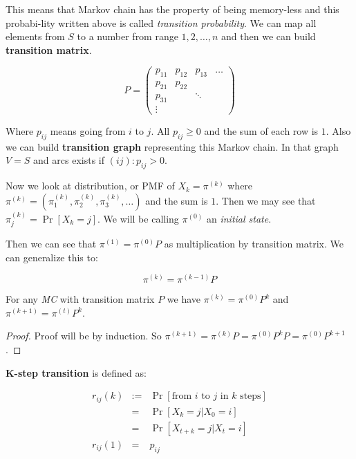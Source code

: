 This means that Markov chain has the property of being memory-less and this probabi-\newline lity written above is called \textit{transition probability}. We can map all elements from $S$ to a number from range $1,2,\dots ,n$ and then we can build \textbf{transition matrix}.

$$
P =
\begin{pmatrix}
p_{11} & p_{12} & p_{13} & \dots \\
p_{21} & p_{22} &  \\
p_{31} &  & \ddots \\
\vdots
\end{pmatrix}
$$

Where $p_{ij}$ means going from $i$ to $j$. All $p_{ij} \geq 0$ and the sum of each row is $1$. Also we can build \textbf{transition graph} representing this Markov chain. In that graph $V = S$ and arcs exists if $(ij) : p_{ij} > 0$.

Now we look at distribution, or PMF of $X_{k} = \pi^{(k)}$ where $\pi^{(k)} = \left( \pi_{1}^{(k)}, \pi_{2}^{(k)},\pi_{3}^{(k)}, \dots \right)$ and the sum is $1$. Then we may see that $\pi_{j}^{(k)} = \Pr[X_{k} = j]$. We will be calling $\pi^{(0)}$ an \textit{initial state}.

Then we can see that $\pi^{(1)} = \pi^{(0)} P$ as multiplication by transition matrix. We can generalize this to:

$$
\pi^{(k)} = \pi^{(k-1)} P
$$

\begin{thm}
	For any \textit{MC} with transition matrix $P$ we have $\pi^{(k)} = \pi^{(0)} P^{k}$ and $\pi^{(k+1)} = \pi^{(t)} P^{k}$.
\end{thm}

\begin{proof}
	Proof will be by induction. So $\pi^{(k+1)} = \pi^{(k)} P = \pi^{(0)} P^{k} P =\pi^{(0)} P^{k+1}$.
\end{proof}

\begin{defn}
	\textbf{K-step transition} is defined as:

	$$
	\begin{array}{rcl}
	r_{ij}(k) & := & \Pr[\text{from }i \text{ to } j \text{ in } k \text{ steps}] \\
	& = & \Pr[X_{k} = j \vert X_{0} = i] \\
	& = & \Pr[X_{t+k} = j \vert X_{t} = i] \\
	r_{ij}(1) & = & p_{ij}
	\end{array}
	$$
\end{defn}

